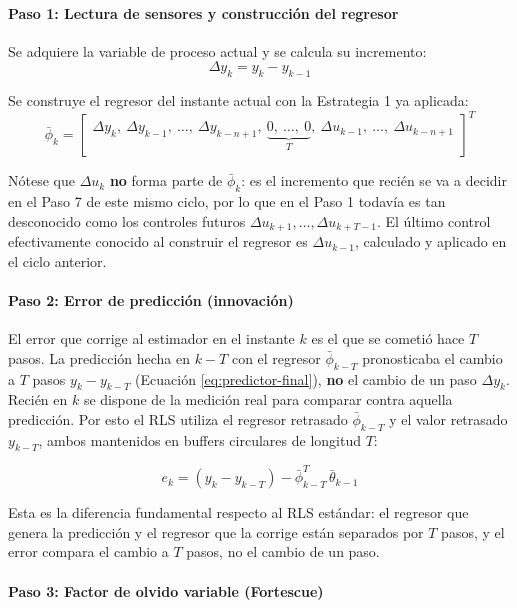 \paragraph{Paso 1: Lectura de sensores y construcción del regresor}

Se adquiere la variable de proceso actual y se calcula su incremento:
\[
    \Delta y_k = y_k - y_{k-1}
\]

Se construye el regresor del instante actual con la Estrategia 1 ya aplicada:
\[
    \bar{\phi}_k =
    \begin{bmatrix}
        \Delta y_k,\ \Delta y_{k-1},\ \ldots,\ \Delta y_{k-n+1},\
        \underbrace{0,\ \ldots,\ 0}_{T},\
        \Delta u_{k-1},\ \ldots,\ \Delta u_{k-n+1}
    \end{bmatrix}^T
\]

Nótese que $\Delta u_k$ \textbf{no} forma parte de $\bar\phi_k$: es el incremento que recién se va a decidir en el Paso 7 de este mismo ciclo, por lo que en el Paso 1 todavía es tan desconocido como los controles futuros $\Delta u_{k+1}, \ldots, \Delta u_{k+T-1}$. El último control efectivamente conocido al construir el regresor es $\Delta u_{k-1}$, calculado y aplicado en el ciclo anterior.

\paragraph{Paso 2: Error de predicción (innovación)}

El error que corrige al estimador en el instante $k$ es el que se cometió hace $T$ pasos. La predicción hecha en $k-T$ con el regresor $\bar\phi_{k-T}$ pronosticaba el cambio a $T$ pasos $y_k - y_{k-T}$ (Ecuación \ref{eq:predictor-final}), \textbf{no} el cambio de un paso $\Delta y_k$. Recién en $k$ se dispone de la medición real para comparar contra aquella predicción. Por esto el RLS utiliza el regresor retrasado $\bar{\phi}_{k-T}$ y el valor retrasado $y_{k-T}$, ambos mantenidos en buffers circulares de longitud $T$:

\[
    e_k = (y_k - y_{k-T}) - \bar{\phi}_{k-T}^T\, \bar{\theta}_{k-1}
\]

Esta es la diferencia fundamental respecto al RLS estándar: el regresor que genera la predicción y el regresor que la corrige están separados por $T$ pasos, y el error compara el cambio a $T$ pasos, no el cambio de un paso.

\paragraph{Paso 3: Factor de olvido variable (Fortescue)}

